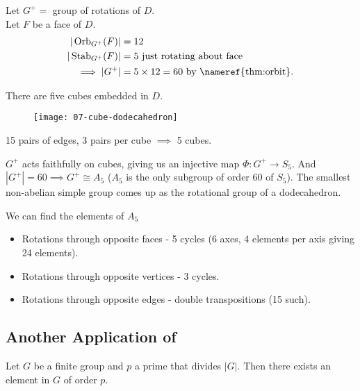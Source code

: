 Let $G^+ =$ group of rotations of $D$. \\
Let $F$ be a face of $D$.
\begin{align*}
    | \operatorname{Orb}_{G^+}(F)| &= 12 \\
    | \operatorname{Stab}_{G^+}(F) | &= 5 \text{ just rotating about face} \\
    \implies |G^+| &= 5 \times 12 = 60 \text{ by \nameref{thm:orbit}.}
\end{align*} 

There are five cubes embedded in $D$.

\begin{figure}
    \centering
    \texttt{[image: 07-cube-dodecahedron]}
\end{figure} 

15 pairs of edges, 3 pairs per cube $\implies$ 5 cubes.

$G^+$ acts faithfully on cubes, giving us an injective map $\Phi : G^+ \to S_5$.
And $|G^+| = 60 \implies G^+ \cong A_5$ ($A_5$ is the only subgroup of order 60 of $S_5$).
The smallest non-abelian simple group comes up as the rotational group of a dodecahedron.

We can find the elements of $A_5$
\begin{itemize}
    \item Rotations through opposite faces - 5 cycles (6 axes, 4 elements per axis giving 24 elements).
    \item Rotations through opposite vertices - 3 cycles.
    \item Rotations through opposite edges - double transpositions (15 such).
\end{itemize} 

\subsection{Another Application of }

\begin{theorem} \label{thm:8}
    Let $G$ be a finite group and $p$ a prime that divides $|G|$.
    Then there exists an element in $G$ of order $p$.
\end{theorem} 

